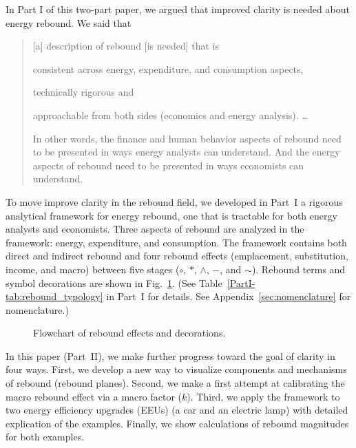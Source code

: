 \documentclass[12pt]{article}\usepackage[]{graphicx}\usepackage[]{xcolor}
\begin{document}
In Part I of this two-part paper, we argued that improved clarity is needed
about energy rebound. 
We said that
%
\begin{quote}
  [a] description of rebound [is needed] that is 
  \begin{enumerate*}[label={(\roman*)}]

    \item consistent across energy, expenditure, and consumption aspects,
  
    \item technically rigorous and
  
    \item approachable from both sides
          (economics and energy analysis). \ldots

  \end{enumerate*}
  In other words, 
  the finance and human behavior aspects of rebound need to be presented 
  in ways energy analysts can understand. 
  And the energy aspects of rebound need to be presented
  in ways economists can understand.
\end{quote}

To move improve clarity in the rebound field, 
we developed in Part~I a rigorous analytical framework 
for energy rebound, 
one that is tractable for both energy analysts and economists.
Three aspects of rebound are analyzed in the framework:
energy, expenditure, and consumption.
The framework contains both
direct and indirect rebound and 
four rebound effects
(emplacement, substitution, income, and macro) 
between five stages ($\circ$, $*$, $\wedge$, $-$, and $\sim$).
Rebound terms and symbol decorations are
shown in Fig.~\ref{fig:flowchart}.
(See Table~\ref{PartI-tab:rebound_typology} in Part~I for details.
See Appendix~\ref{sec:nomenclature} for nomenclature.)

\begin{figure}
\centering
  
\caption{Flowchart of rebound effects and decorations.}
\label{fig:flowchart}
\end{figure}

In this paper (Part~II), we make further progress toward the goal of clarity
in four ways.
First, we develop a new way to visualize 
components and mechanisms of rebound
(rebound planes).
Second, we make a first attempt at calibrating the macro rebound effect 
via a macro factor ($k$). 
Third, we apply the framework to two energy efficiency upgrades (EEUs) 
(a car and an electric lamp)
with detailed explication of the examples.
Finally, we show 
calculations of rebound magnitudes for both examples.
\end{document}
